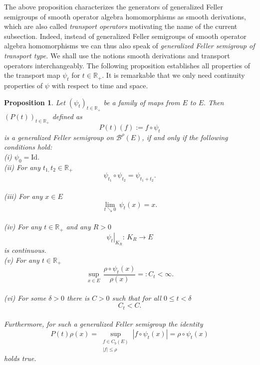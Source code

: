 \documentclass[a4paper,12pt]{article}
\newtheorem{proposition}[theorem]{Proposition}
\theoremstyle{definition}
\theoremstyle{remark}
\numberwithin{equation}{section}
\numberwithin{theorem}{section}
\begin{document}
The above proposition characterizes the generators of generalized Feller semigroups of smooth operator algebra homomorphisms as smooth derivations, which are also called \emph{transport operators} motivating the name of the current subsection.
Indeed,  instead of generalized Feller semigroups of  smooth operator algebra homomorphisms we can thus also speak of \emph{generalized Feller semigroup of transport type.} We shall use the  notions smooth derivations and transport operators interchangeably.
The following proposition establishes all properties of the transport map $\psi_t$ for $ t \in \mathbb{R}_+$. It is remarkable that we only need continuity properties of $\psi$ with respect to time and space.




\begin{proposition}
\label{prop:characterization of gFs of transport type} Let $\left(\psi_{t}\right)_{t\in\mathbb{R}_{+}}$
be a family of maps from $E$ to $E.$
 Then $\left(P(t)\right)_{t\in\mathbb{R}_{+}}$ defined as
\[
P(t)(f):=f\circ\psi_{t}
\]
is a generalized Feller semigroup on $\mathcal{\mathscr{B}}^{\rho}(E)$,
 if and only if the following conditions hold:\\
(i) $\psi_{0}=\text{Id}$.\\
(ii) For any $t_{1,}t_{2}\in\mathbb{R}_{+}$
\[
\psi_{t_{1}}\circ\psi_{t_{2}}=\psi_{t_{1}+t_{2}}.
\]
\\
(iii) For any $x\in E$
\[
\underset{t\searrow0}{\lim}\,\psi_{t}(x)=x.
\]
\\
(iv) For any $t\in\mathbb{R}_{+}$ and any $R>0$
\[
\left.\psi_{t}\right|_{K_{R}}:\,K_{R}\rightarrow E
\]
 is continuous.\\
(v) For any $t\in\mathbb{R}_{+}$
\[
\underset{x\in E}{\sup}\,\frac{\rho\circ\psi_{t}(x)}{\rho(x)}=:C_{t}<\infty.
\]
\\
(vi) For some $\delta>0$ there is $C>0$ such that for all $0\leq t<\delta$
\[
C_{t}<C.
\]
\\
Furthermore, for such a generalized Feller semigroup 
the identity
\begin{equation}
P(t)\rho(x)=\underset{\begin{array}{c}
f\in C_{b}(E)\\
\left|f\right|\leq\rho
\end{array}}{\sup}\left|f\circ\psi_{t}(x)\right|=\rho\circ\psi_{t}(x)\label{eq:P(t)rhoforGFSoftransporttype}
\end{equation}
holds true. 


\end{proposition}
\end{document}
